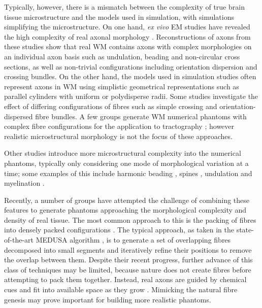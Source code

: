 Typically, however, there is a mismatch between the complexity of true brain tissue microstructure and the models used in simulation, with simulations simplifying the microstructure.
On one hand, \emph{ex vivo} \ac{EM} studies have revealed the high complexity of real axonal morphology \cite{Abdollahzadeh2019,Lee2019b,Salo2018}.
Reconstructions of axons from these studies show that real \ac{WM} contains axons with complex morphologies on an individual axon basis such as undulation, beading and non-circular cross sections, as well as non-trivial configurations including orientation dispersion and crossing bundles.
On the other hand, the models used in simulation studies often represent axons in \ac{WM} using simplistic geometrical representations such as parallel cylinders with uniform \cite{Fieremans2010,Nilsson2010,Nilsson2009,Ford1997} or polydisperse \cite{Alexander2010,Hall2009} radii.
Some studies investigate the effect of differing configurations of fibres such as simple crossing \cite{Rensonnet2017,Zhang2011a} and orientation-dispersed \cite{Tariq2016,Zhang2012,Zhang2011} fibre bundles.
A few groups generate \ac{WM} numerical phantoms with complex fibre configurations for the application to  tractography \cite{Close2009,Neher2014}; however realistic microstructural morphology is not the focus of these approaches.

Other studies introduce more microstructural complexity into the numerical phantoms, typically only considering one mode of morphological variation at a time; some examples of this include harmonic beading \cite{Budde2010,Landman2010}, spines \cite{Palombo2018}, undulation \cite{Brabec2019,Nilsson2012} and myelination \cite{Brusini2019}.


Recently, a number of groups have attempted the challenge of combining these features to generate phantoms approaching the morphological complexity and density of real tissue.
The most common approach to this is the packing of fibres into densely packed configurations \cite{Close2009,Ginsburger2018,Ginsburger2019,Rafael-Patino2018}.
The typical approach, as taken in the state-of-the-art MEDUSA algorithm \cite{Ginsburger2019}, is to generate a set of overlapping fibres decomposed into small segments and iteratively refine their positions to remove the overlap between them.
Despite their recent progress, further advance of this class of techniques may be limited, because nature does not create fibres before attempting to pack them together.
Instead, real axons are guided by chemical cues and fit into available space as they grow \cite{Price2017,Lowery2009}.
Mimicking the natural fibre genesis may prove important for building more realistic phantoms.

